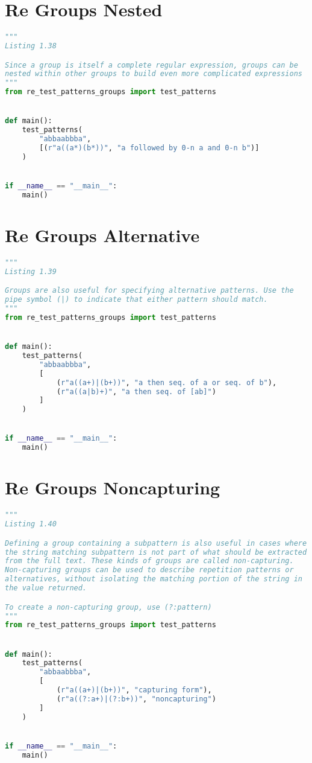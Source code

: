 \documentclass[a4paper,landscape]{report}
\begin{document}
\section{Re Groups Nested}
\begin{lstlisting}[language=Python]
"""
Listing 1.38

Since a group is itself a complete regular expression, groups can be
nested within other groups to build even more complicated expressions
"""
from re_test_patterns_groups import test_patterns


def main():
    test_patterns(
        "abbaabbba",
        [(r"a((a*)(b*))", "a followed by 0-n a and 0-n b")]
    )


if __name__ == "__main__":
    main()

\end{lstlisting}
\section{Re Groups Alternative}
\begin{lstlisting}[language=Python]
"""
Listing 1.39

Groups are also useful for specifying alternative patterns. Use the
pipe symbol (|) to indicate that either pattern should match.
"""
from re_test_patterns_groups import test_patterns


def main():
    test_patterns(
        "abbaabbba",
        [
            (r"a((a+)|(b+))", "a then seq. of a or seq. of b"),
            (r"a((a|b)+)", "a then seq. of [ab]")
        ]
    )


if __name__ == "__main__":
    main()

\end{lstlisting}
\section{Re Groups Noncapturing}
\begin{lstlisting}[language=Python]
"""
Listing 1.40

Defining a group containing a subpattern is also useful in cases where
the string matching subpattern is not part of what should be extracted
from the full text. These kinds of groups are called non-capturing.
Non-capturing groups can be used to describe repetition patterns or
alternatives, without isolating the matching portion of the string in
the value returned.

To create a non-capturing group, use (?:pattern)
"""
from re_test_patterns_groups import test_patterns


def main():
    test_patterns(
        "abbaabbba",
        [
            (r"a((a+)|(b+))", "capturing form"),
            (r"a((?:a+)|(?:b+))", "noncapturing")
        ]
    )


if __name__ == "__main__":
    main()

\end{lstlisting}
\end{document}
